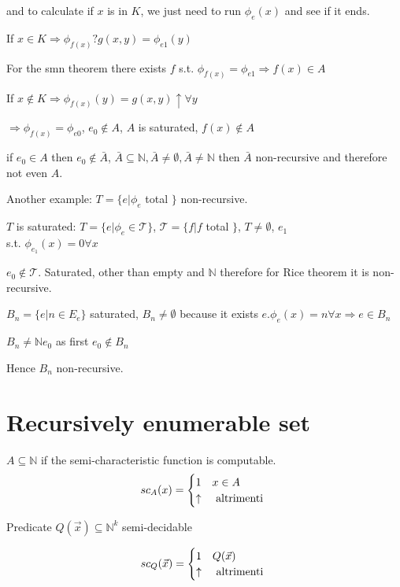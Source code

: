 \documentclass{amsbook}
\newcommand{\nat}{\ensuremath{\mathbb{N}}}
\theoremstyle{definition}
\theoremstyle{remark}
\numberwithin{section}{chapter}
\numberwithin{equation}{chapter}
\begin{document}
and to calculate if $x$ is in $K$, we just need to run $ \phi_e(x) $ and see if it ends.

If $ x\in K \Rightarrow \phi_{f(x)} ? g(x,y) = \phi_{e1}(y)$

For the smn theorem there exists $f$ s.t. $ \phi_{f(x)} = \phi_{e1} \Rightarrow f(x)\in A$

If $ x \not\in K \Rightarrow \phi_{f(x)}(y) = g(x,y) \uparrow \forall y $

$ \Rightarrow \phi_{f(x)} = \phi_{e0} $, $ e_0 \not\in A $, $A$ is saturated, $ f(x)\not\in A $

if $ e_0 \in A $ then $ e_0 \not \in \bar{A} $, $ \bar{A} \subseteq \nat, \bar{A} \not= \emptyset, \bar{A}\not=\nat $ then $ \bar{A} $ non-recursive and therefore not even $A$.


Another example: $ T = \{e | \phi_e $ total $ \} $ non-recursive.

$T$ is saturated: $ T = \{e | \phi_e \in \mathcal{T} \} $, $ \mathcal{T} = \{f | f $ total $ \} $, $ T\not=\emptyset $, $ e_1 $\\ s.t. $ \phi_{e_1}(x) = 0 \forall x $

$ e_0 \not\in \mathcal{T} $. Saturated, other than empty and $ \nat $ therefore for Rice theorem it is non-recursive.

$ B_n = \{e | n \in E_e \} $ saturated, $ B_n \not= \emptyset $ because it exists $ e. \phi_e(x) = n \forall x \Rightarrow e \in B_n $

$ B_n \not= \nat e_0$ as first $ e_0 \not\in B_n $

Hence $ B_n $ non-recursive.

\chapter {Recursively enumerable set}

$ A \subseteq \nat $ if the semi-characteristic function is computable.
\begin{equation*}
	sc_A(x) = \begin{cases}
		1        & x \in A        \\
		\uparrow & $ altrimenti $
	\end{cases}
\end{equation*}

Predicate $ Q(\vec{x}) \subseteq \nat^k $ semi-decidable

\begin{equation*}
	sc_Q(\vec{x}) = \begin{cases}
		1        & Q(\vec{x})     \\
		\uparrow & $ altrimenti $
	\end{cases}
\end{equation*}
\end{document}
